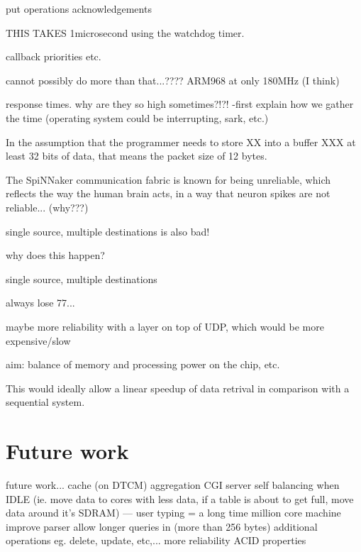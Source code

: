 put operations
acknowledgements

THIS TAKES 1microsecond using the watchdog timer.

callback priorities etc.

cannot possibly do more than that...????
ARM968 at only 180MHz (I think)

response times. why are they so high sometimes?!?!
-first explain how we gather the time (operating system could be interrupting, sark, etc.)


In the assumption that the programmer needs to store XX into a buffer XXX
at least 32 bits of data, that means the packet size of 12 bytes.


The SpiNNaker communication fabric is known for being unreliable, which reflects the way the human brain acts, in a way that neuron spikes are not reliable... (why???)

single source, multiple destinations is also bad!

why does this happen?

single source, multiple destinations

always lose 77...

maybe more reliability with a layer on top of UDP, which would be more expensive/slow

aim: balance of memory and processing power on the chip, etc.

This would ideally allow a linear speedup of data retrival in comparison with a sequential system.


\section{Future work}
future work...
cache (on DTCM)
aggregation
CGI server
self balancing when IDLE (ie. move data to cores with less data, if a table is about to get full, move data around it's SDRAM) --- user typing = a long time
million core machine
improve parser
allow longer queries in (more than 256 bytes)
additional operations eg. delete, update, etc,...
more reliability
ACID properties